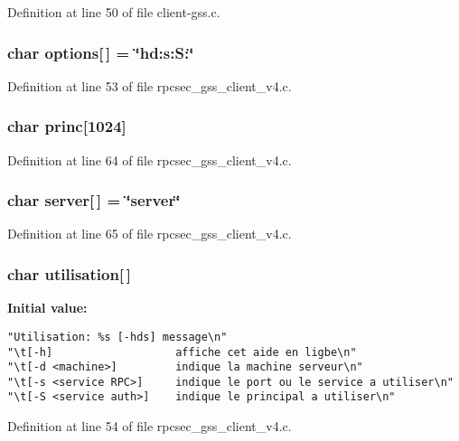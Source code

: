 Definition at line 50 of file client-gss.c.
\subsubsection{\setlength{\rightskip}{0pt plus 5cm}char {\bf options}[$\,$] = \char`\"{}hd:s:S:\char`\"{}}\label{rpcsec__gss__client__v4_8c_a11}




Definition at line 53 of file rpcsec\_\-gss\_\-client\_\-v4.c.
\subsubsection{\setlength{\rightskip}{0pt plus 5cm}char {\bf princ}[1024]}\label{rpcsec__gss__client__v4_8c_a13}




Definition at line 64 of file rpcsec\_\-gss\_\-client\_\-v4.c.
\subsubsection{\setlength{\rightskip}{0pt plus 5cm}char {\bf server}[$\,$] = \char`\"{}server\char`\"{}}\label{rpcsec__gss__client__v4_8c_a14}




Definition at line 65 of file rpcsec\_\-gss\_\-client\_\-v4.c.
\subsubsection{\setlength{\rightskip}{0pt plus 5cm}char {\bf utilisation}[$\,$]}\label{rpcsec__gss__client__v4_8c_a12}


{\bf Initial value:}

\footnotesize\begin{verbatim}
"Utilisation: %s [-hds] message\n"
"\t[-h]                   affiche cet aide en ligbe\n"
"\t[-d <machine>]         indique la machine serveur\n"
"\t[-s <service RPC>]     indique le port ou le service a utiliser\n" 
"\t[-S <service auth>]    indique le principal a utiliser\n"
\end{verbatim}\normalsize 


Definition at line 54 of file rpcsec\_\-gss\_\-client\_\-v4.c.